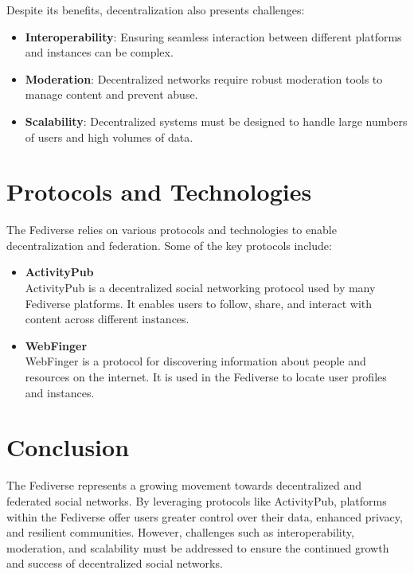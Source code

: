 Despite its benefits, decentralization also presents challenges:

\begin{itemize}
  \item \textbf{Interoperability}: Ensuring seamless interaction between different platforms and instances can be complex.
  \item \textbf{Moderation}: Decentralized networks require robust moderation tools to manage content and prevent abuse.
  \item \textbf{Scalability}: Decentralized systems must be designed to handle large numbers of users and high volumes of data.
\end{itemize}

\section{Protocols and Technologies}

The Fediverse relies on various protocols and technologies to enable decentralization and federation. Some of the key protocols include:\\

\begin{itemize}
  \item \textbf{ActivityPub}\cite{ActivityPub}\\
    ActivityPub is a decentralized social networking protocol used by many Fediverse platforms. It enables users to follow, share, and interact with content across different instances.

  \item \textbf{WebFinger}\cite{webfinger}\\
    WebFinger is a protocol for discovering information about people and resources on the internet. It is used in the Fediverse to locate user profiles and instances.
\end{itemize}

\section{Conclusion}

The Fediverse represents a growing movement towards decentralized and federated social networks. By leveraging protocols like ActivityPub, platforms within the Fediverse offer users greater control over their data, enhanced privacy, and resilient communities. However, challenges such as interoperability, moderation, and scalability must be addressed to ensure the continued growth and success of decentralized social networks.

